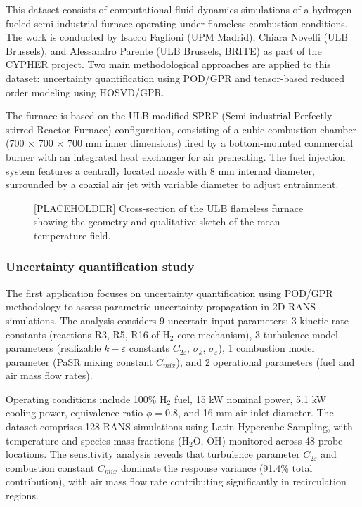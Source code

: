 This dataset consists of computational fluid dynamics simulations of a hydrogen-fueled semi-industrial furnace operating under flameless combustion conditions. The work is conducted by Isacco Faglioni (UPM Madrid), Chiara Novelli (ULB Brussels), and Alessandro Parente (ULB Brussels, BRITE) as part of the CYPHER project. Two main methodological approaches are applied to this dataset: uncertainty quantification using POD/GPR and tensor-based reduced order modeling using HOSVD/GPR.

The furnace is based on the ULB-modified SPRF (Semi-industrial Perfectly stirred Reactor Furnace) configuration, consisting of a cubic combustion chamber (700 × 700 × 700 mm inner dimensions) fired by a bottom-mounted commercial burner with an integrated heat exchanger for air preheating. The fuel injection system features a centrally located nozzle with 8 mm internal diameter, surrounded by a coaxial air jet with variable diameter to adjust entrainment.

\FloatBarrier
\begin{figure}[htbp]
    \centering
    \caption{[PLACEHOLDER] Cross-section of the ULB flameless furnace showing the geometry and qualitative sketch of the mean temperature field.}
    \label{fig:ulb_data}
\end{figure}
\FloatBarrier

\subsubsection*{Uncertainty quantification study}

The first application focuses on uncertainty quantification using POD/GPR methodology to assess parametric uncertainty propagation in 2D RANS simulations. The analysis considers 9 uncertain input parameters: 3 kinetic rate constants (reactions R3, R5, R16 of H$_2$ core mechanism), 3 turbulence model parameters (realizable $k-\varepsilon$ constants $C_{2\varepsilon}$, $\sigma_k$, $\sigma_\varepsilon$), 1 combustion model parameter (PaSR mixing constant $C_{mix}$), and 2 operational parameters (fuel and air mass flow rates).

Operating conditions include 100\% H$_2$ fuel, 15 kW nominal power, 5.1 kW cooling power, equivalence ratio $\phi = 0.8$, and 16 mm air inlet diameter. The dataset comprises 128 RANS simulations using Latin Hypercube Sampling, with temperature and species mass fractions (H$_2$O, OH) monitored across 48 probe locations. The sensitivity analysis reveals that turbulence parameter $C_{2\varepsilon}$ and combustion constant $C_{mix}$ dominate the response variance (91.4\% total contribution), with air mass flow rate contributing significantly in recirculation regions.

